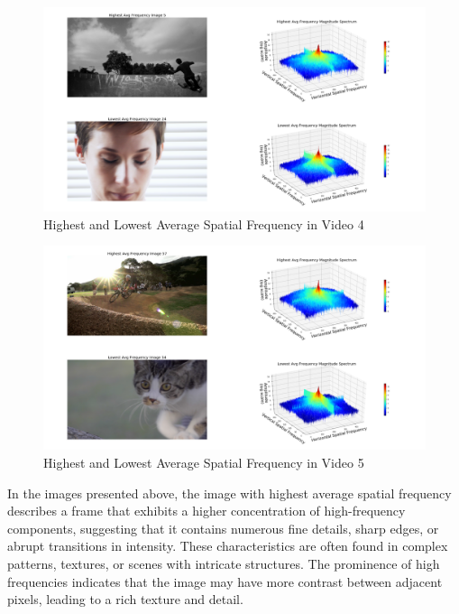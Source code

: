 \documentclass{ioereport}
\begin{document}
\begin{figure}[H]
    \centering
    \includegraphics[width=\linewidth]{assets/spatial_frequency/video4spatialfreq.png}
    \caption{Highest and Lowest Average Spatial Frequency in Video 4}
    \label{fig:spatial-frequency-4}
\end{figure}

\begin{figure}[H]
    \centering
    \includegraphics[width=\linewidth]{assets/spatial_frequency/video5spatialfreq.png}
    \caption{Highest and Lowest Average Spatial Frequency in Video 5}
    \label{fig:spatial-frequency-5}
\end{figure}

In the images presented above, the image with highest average spatial frequency describes a frame that exhibits a higher concentration of high-frequency components, suggesting that it contains numerous fine details, sharp edges, or abrupt transitions in intensity. These characteristics are often found in complex patterns, textures, or scenes with intricate structures. The prominence of high frequencies indicates that the image may have more contrast between adjacent pixels, leading to a rich texture and detail.
\end{document}
